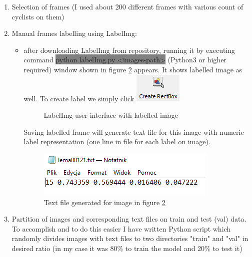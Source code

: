 \begin{enumerate}
\begin{itemize}
    \end{itemize}
    \item Selection of frames (I used about 200 different frames with various count of cyclists on them)
    \item Manual frames labelling using LabelImg:
    \begin{itemize}
        \item after downloading LabelImg from repository, running it by executing command \colorbox{Gray}{python labelImg.py <images-path>} (Python3 or higher required) window shown in figure \ref{fig:labelimg} appears. It shows labelled image as well. To create label we simply click \includegraphics[scale=0.75]{images/button}
        \begin{figure}[H]
            \centering
            \caption{LabelImg user interface with labelled image}
            \label{fig:labelimg}
        \end{figure}
        Saving labelled frame will generate text file for this image with numeric label representation (one line in file for each label on image).
        \begin{figure}[H]
            \centering
            \includegraphics{images/text}
            \caption{Text file generated for image in figure \ref{fig:labelimg}}
            \label{fig:labelimg}
        \end{figure}
    \end{itemize}
    \item Partition of images and corresponding text files on train and test (val) data. To accomplish and to do this easier I have written Python script which randomly divides images with text files to two directories "train" and "val" in desired ratio (in my case it was 80\% to train the model and 20\% to test it)
\end{enumerate}

